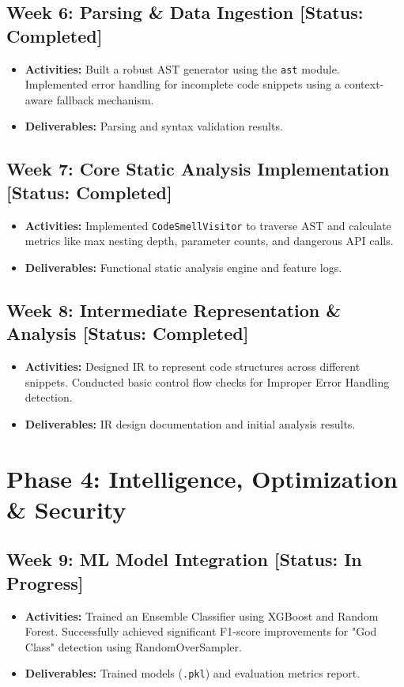 \documentclass[12pt,a4paper]{article}
\begin{document}
\subsection*{Week 6: Parsing \& Data Ingestion [Status: Completed]}
\begin{itemize}[noitemsep,topsep=0pt]
    \item \textbf{Activities:} Built a robust AST generator using the \texttt{ast} module. Implemented error handling for incomplete code snippets using a context-aware fallback mechanism.
    \item \textbf{Deliverables:} Parsing and syntax validation results.
\end{itemize}

\subsection*{Week 7: Core Static Analysis Implementation [Status: Completed]}
\begin{itemize}[noitemsep,topsep=0pt]
    \item \textbf{Activities:} Implemented \texttt{CodeSmellVisitor} to traverse AST and calculate metrics like max nesting depth, parameter counts, and dangerous API calls.
    \item \textbf{Deliverables:} Functional static analysis engine and feature logs.
\end{itemize}

\subsection*{Week 8: Intermediate Representation \& Analysis [Status: Completed]}
\begin{itemize}[noitemsep,topsep=0pt]
    \item \textbf{Activities:} Designed IR to represent code structures across different snippets. Conducted basic control flow checks for Improper Error Handling detection.
    \item \textbf{Deliverables:} IR design documentation and initial analysis results.
\end{itemize}

\section{Phase 4: Intelligence, Optimization \& Security}

\subsection*{Week 9: ML Model Integration [Status: In Progress]}
\begin{itemize}[noitemsep,topsep=0pt]
    \item \textbf{Activities:} Trained an Ensemble Classifier using XGBoost and Random Forest. Successfully achieved significant F1-score improvements for "God Class" detection using RandomOverSampler.
    \item \textbf{Deliverables:} Trained models (\texttt{.pkl}) and evaluation metrics report.
\end{itemize}
\end{document}
